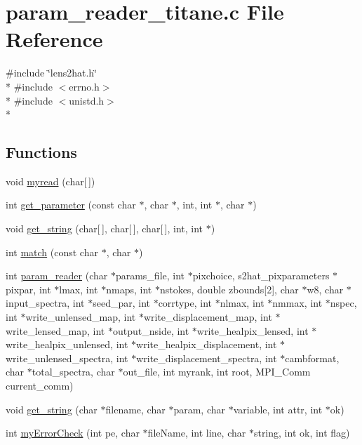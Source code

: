 \section{param\-\_\-reader\-\_\-titane.\-c File Reference}
\label{old_2param__reader__20121302_2param__reader__titane_8c}
{\ttfamily \#include \char`\"{}lens2hat.\-h\char`\"{}}\\*
{\ttfamily \#include $<$errno.\-h$>$}\\*
{\ttfamily \#include $<$unistd.\-h$>$}\\*
\subsection*{Functions}
\begin{DoxyCompactItemize}
\item 
void \hyperlink{old_2param__reader__20121302_2param__reader__titane_8c_a50c0568f618886d78986c4a9d6a23ba4}{myread} (char\mbox{[}$\,$\mbox{]})
\item 
int \hyperlink{old_2param__reader__20121302_2param__reader__titane_8c_aa58f4ecc3318546d08e4282c739db7a3}{get\-\_\-parameter} (const char $\ast$, char $\ast$, int, int $\ast$, char $\ast$)
\item 
void \hyperlink{old_2param__reader__20121302_2param__reader__titane_8c_acdf8e6c6f50db79679922d3dbf74dd84}{get\-\_\-string} (char\mbox{[}$\,$\mbox{]}, char\mbox{[}$\,$\mbox{]}, char\mbox{[}$\,$\mbox{]}, int, int $\ast$)
\item 
int \hyperlink{old_2param__reader__20121302_2param__reader__titane_8c_af71971b64e93dd85136d531400035e57}{match} (const char $\ast$, char $\ast$)
\item 
int \hyperlink{old_2param__reader__20121302_2param__reader__titane_8c_a990ccd7e0b3352322502e77838c159d7}{param\-\_\-reader} (char $\ast$params\-\_\-file, int $\ast$pixchoice, s2hat\-\_\-pixparameters $\ast$pixpar, int $\ast$lmax, int $\ast$nmaps, int $\ast$nstokes, double zbounds\mbox{[}2\mbox{]}, char $\ast$w8, char $\ast$input\-\_\-spectra, int $\ast$seed\-\_\-par, int $\ast$corrtype, int $\ast$nlmax, int $\ast$nmmax, int $\ast$nspec, int $\ast$write\-\_\-unlensed\-\_\-map, int $\ast$write\-\_\-displacement\-\_\-map, int $\ast$write\-\_\-lensed\-\_\-map, int $\ast$output\-\_\-nside, int $\ast$write\-\_\-healpix\-\_\-lensed, int $\ast$write\-\_\-healpix\-\_\-unlensed, int $\ast$write\-\_\-healpix\-\_\-displacement, int $\ast$write\-\_\-unlensed\-\_\-spectra, int $\ast$write\-\_\-displacement\-\_\-spectra, int $\ast$cambformat, char $\ast$total\-\_\-spectra, char $\ast$out\-\_\-file, int myrank, int root, M\-P\-I\-\_\-\-Comm current\-\_\-comm)
\item 
void \hyperlink{old_2param__reader__20121302_2param__reader__titane_8c_a1be51b19c79f5c49c6ce2128259fc093}{get\-\_\-string} (char $\ast$filename, char $\ast$param, char $\ast$variable, int attr, int $\ast$ok)
\item 
int \hyperlink{old_2param__reader__20121302_2param__reader__titane_8c_a70bcbd531a6e4abc62d73f5b4532c2cc}{my\-Error\-Check} (int pe, char $\ast$file\-Name, int line, char $\ast$string, int ok, int flag)
\end{DoxyCompactItemize}


